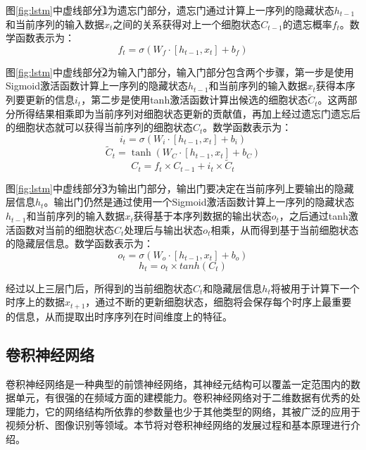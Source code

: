 图\ref{fig:lstm}中虚线部分\textcircled{1}为遗忘门部分，遗忘门通过计算上一序列的隐藏状态$h_{t-1}$和当前序列的输入数据$x_t$之间的关系获得对上一个细胞状态$C_{t-1}$的遗忘概率$f_{t}$。数学函数表示为：
\begin{equation}
 f_t= \sigma(W_f \cdot [h_{t-1},x_t]+b_f)
\end{equation}

图\ref{fig:lstm}中虚线部分\textcircled{2}为输入门部分，输入门部分包含两个步骤，第一步是使用Sigmoid激活函数计算上一序列的隐藏状态$h_{t-1}$和当前序列的输入数据$x_t$获得本序列要更新的信息$i_t$，第二步是使用tanh激活函数计算出候选的细胞状态$\tilde C_t$。这两部分所得结果相乘即为当前序列对细胞状态更新的贡献值，再加上经过遗忘门遗忘后的细胞状态就可以获得当前序列的细胞状态$C_{t}$。数学函数表示为：
\begin{equation}
 i_t= \sigma(W_i \cdot [h_{t-1},x_t]+b_i)
\end{equation}
\begin{equation}
 \tilde C_t= \tanh(W_C \cdot [h_{t-1},x_t]+b_C)
\end{equation}
\begin{equation}
 C_t= f_t \times C_{t-1} + i_t \times {\tilde C_t}
\end{equation}

图\ref{fig:lstm}中虚线部分\textcircled{3}为输出门部分，输出门要决定在当前序列上要输出的隐藏层信息$h_t$。输出门仍然是通过使用一个Sigmoid激活函数计算上一序列的隐藏状态$h_{t-1}$和当前序列的输入数据$x_t$获得基于本序列数据的输出状态$o_t$，之后通过tanh激活函数对当前的细胞状态$C_t$处理后与输出状态$o_t$相乘，从而得到基于当前细胞状态的隐藏层信息。数学函数表示为：
\begin{equation}
 o_t= \sigma(W_o \cdot [h_{t-1},x_t]+b_o)
\end{equation}
\begin{equation}
 h_t= o_t \times tanh(C_t)
\end{equation}

经过以上三层门后，所得到的当前细胞状态$C_t$和隐藏层信息$h_t$将被用于计算下一个时序上的数据$x_{t+1}$，通过不断的更新细胞状态，细胞将会保存每个时序上最重要的信息，从而提取出时序序列在时间维度上的特征。

\subsection{卷积神经网络}
\label{sec:cnn}
卷积神经网络是一种典型的前馈神经网络，其神经元结构可以覆盖一定范围内的数据单元，有很强的在频域方面的建模能力。卷积神经网络对于二维数据有优秀的处理能力，它的网络结构所依靠的参数量也少于其他类型的网络，其被广泛的应用于视频分析、图像识别等领域。本节将对卷积神经网络的发展过程和基本原理进行介绍。
